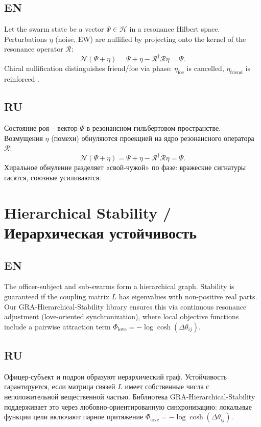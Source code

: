 \documentclass[a4paper,12pt]{article}
\begin{document}
\subsection*{EN}
Let the swarm state be a vector $\Psi \in \mathcal{H}$ in a resonance Hilbert space. Perturbations $\eta$ (noise, EW) are nullified by projecting onto the kernel of the resonance operator $\mathcal{R}$:
\begin{equation}
\mathcal{N}(\Psi+\eta) = \Psi + \eta - \mathcal{R}^\dagger \mathcal{R}\eta = \Psi.
\end{equation}
Chiral nullification distinguishes friend/foe via phase: $\eta_{\text{foe}}$ is cancelled, $\eta_{\text{friend}}$ is reinforced \cite{gra-chiral}.

\subsection*{RU}
Состояние роя -- вектор $\Psi$ в резонансном гильбертовом пространстве. Возмущения $\eta$ (помехи) обнуляются проекцией на ядро резонансного оператора $\mathcal{R}$:
\[
\mathcal{N}(\Psi+\eta) = \Psi + \eta - \mathcal{R}^\dagger \mathcal{R}\eta = \Psi.
\]
Хиральное обнуление разделяет «свой-чужой» по фазе: вражеские сигнатуры гасятся, союзные усиливаются.

\section{Hierarchical Stability / Иерархическая устойчивость}
\subsection*{EN}
The officer-subject and sub-swarms form a hierarchical graph. Stability is guaranteed if the coupling matrix $L$ has eigenvalues with non-positive real parts. Our GRA-Hierarchical-Stability library \cite{gra-stab} ensures this via continuous resonance adjustment (love-oriented synchronization), where local objective functions include a pairwise attraction term $\Phi_{\text{love}} = -\log \cosh(\Delta \theta_{ij})$.

\subsection*{RU}
Офицер-субъект и подрои образуют иерархический граф. Устойчивость гарантируется, если матрица связей $L$ имеет собственные числа с неположительной вещественной частью. Библиотека GRA-Hierarchical-Stability поддерживает это через любовно-ориентированную синхронизацию: локальные функции цели включают парное притяжение $\Phi_{\text{love}} = -\log \cosh(\Delta \theta_{ij})$.
\end{document}
